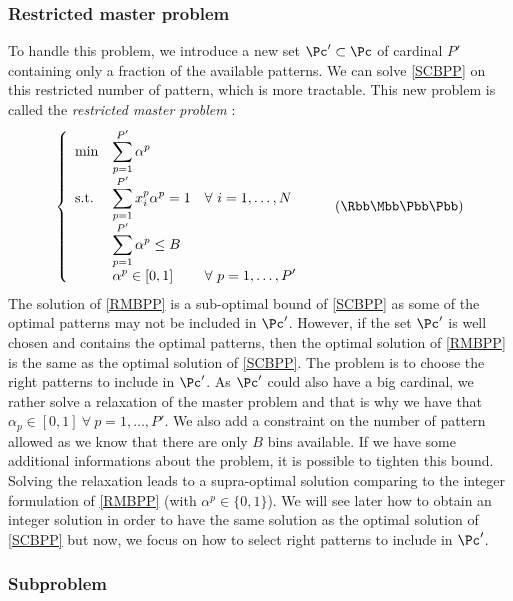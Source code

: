 \subsubsection{Restricted master problem}

To handle this problem, we introduce a new set $\Pc' \subset \Pc$ of cardinal $P'$ containing only a fraction of the available patterns. We can solve \eqref{SCBPP} on this restricted number of pattern, which is more tractable. This new problem is called the \textit{restricted master problem} :
\begin{equation}
	\label{RMBPP}
	\left \{
	\begin{array}{*5{>{\displaystyle}l}}
	\min & \sum_{p=1}^{P'} \alpha^p \\
	\st & \sum_{p=1}^{P'} x_i^p\alpha^p = 1 & \forall \ i = 1,\dots,N \\
	& \sum_{p=1}^{P'} \alpha^p \leq B \\
	& \alpha^{p} \in [0,1] &  \forall \ p = 1,\dots,P'
	\end{array}
	\right.
	\tag{$\Rbb\Mbb\Bbb\Pbb\Pbb$}
\end{equation}
The solution of \eqref{RMBPP} is a sub-optimal bound of \eqref{SCBPP} as some of the optimal patterns may not be included in $\Pc'$. However, if the set $\Pc'$ is well chosen and contains the optimal patterns, then the optimal solution of \eqref{RMBPP} is the same as the optimal solution of \eqref{SCBPP}. The problem is to choose the right patterns to include in $\Pc'$. As $\Pc'$ could also have a big cardinal, we rather solve a relaxation of the master problem and that is why we have that $\alpha_{p} \in [0,1] \ \forall \ p = 1,\dots,P'$. We also add a constraint on the number of pattern allowed as we know that there are only $B$ bins available. If we have some additional informations about the problem, it is possible to tighten this bound. Solving the relaxation leads to a supra-optimal solution comparing to the integer formulation of \eqref{RMBPP} (with $ \alpha^{p} \in \{0,1\}$). We will see later how to obtain an integer solution in order to have the same solution as the optimal solution of \eqref{SCBPP} but now, we focus on how to select right patterns to include in $\Pc'$.

\subsubsection{Subproblem}
\label{subproblem}

